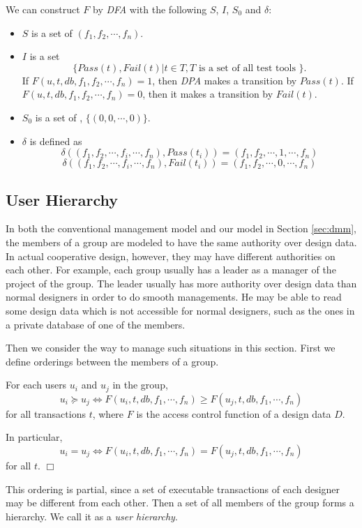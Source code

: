We can construct $F$ by {\em DFA} with the following $S$, $I$, $S_0$ 
and $\delta$:
\begin{itemize}
\item $S$ is a set of \tfs $(f_1, f_2, \cdots, f_n)$.
\item $I$ is a set \[ \{Pass(t), Fail(t) | t \in T, T \mbox{ is a set of
all test tools } \} .\] 
If $F(u, t, db, f_1, f_2, \cdots, f_n) = 1$, then {\em DPA} makes a 
transition by $Pass(t)$.
If $F(u, t, db, f_1, f_2, \cdots, f_n) = 0$, then it makes a transition
by $Fail(t)$.
\item $S_0$ is a set of \tfs,  $\{(0, 0, \cdots, 0)\}$.
\item $\delta$ is defined as
\[ \delta((f_1, f_2, \cdots, f_i, \cdots, f_n), Pass(t_i)) = (f_1, f_2, 
\cdots, 1, \cdots, f_n)\]
\[\delta((f_1, f_2, \cdots, f_i, \cdots, f_n), Fail(t_i)) = (f_1, f_2, 
\cdots, 0, \cdots, f_n)\]
\end{itemize}

\subsection{User Hierarchy}
\label{subsec:userhierarchy}
In both the conventional management model and our model in Section 
\ref{sec:dmm}, the members of a
group are modeled to have the same authority over design data.
In actual cooperative design, however, they may have different
authorities on each other.
For example, each group usually has a leader 
as a manager of the project of the group.
The leader usually has more authority over design data than normal
designers in order to do smooth managements.
He may be able to read some design data which is not 
accessible for normal designers, such as the ones in a private database
of one of the members.

Then we consider the way to manage such situations in this section.
First we define orderings between the members of a group.
\begin{definition} \label{def:user-part-order}
For each users $u_i$ and $u_j$ in the group, 
\[ u_i \succeq u_j \iff F(u_i, t, db, f_1, 
\cdots, f_n) \geq F(u_j, t, db, f_1, \cdots, f_n) \]
for all transactions $t$, 
where $F$ is the access control function of a design data $D$. 

In particular, 
\[ u_i = u_j \iff F(u_i, t, db, f_1, \cdots, f_n) =
F(u_j, t, db, f_1, \cdots, f_n) \]
for all $t$. \hfill$\Box$
\end{definition}
This ordering is partial, since a set of executable transactions of each
designer may be different from each other.
Then a set of all members of the group forms a hierarchy.
We call it as a {\em user hierarchy}.

